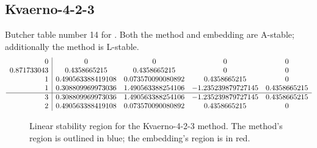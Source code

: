 \documentclass[letterpaper,10pt,english]{sphinxmanual}
\begin{document}
\subsection{Kvaerno-4-2-3}
\label{Butcher:butcher-kvaerno-4-2-3}\label{Butcher:kvaerno-4-2-3}
Butcher table number 14
for {\hyperref[c_interface/User_callable:c.ARKodeSetIRKTableNum]{\emph{}}}.  Both the
method and embedding are A-stable; additionally the method is L-stable.
\begin{gather}
\begin{split}\begin{array}{r|cccc}
  0 & 0 & 0 & 0 & 0 \\
  0.871733043 & 0.4358665215 & 0.4358665215 & 0 & 0 \\
  1 & 0.490563388419108 & 0.073570090080892 & 0.4358665215 & 0 \\
  1 & 0.308809969973036 & 1.490563388254106 & -1.235239879727145 & 0.4358665215 \\
  \hline
  3 & 0.308809969973036 & 1.490563388254106 & -1.235239879727145 & 0.4358665215 \\
  2 & 0.490563388419108 & 0.073570090080892 & 0.4358665215 & 0
\end{array}\end{split}\notag
\end{gather}\begin{figure}[htbp]
\centering
\capstart

\caption{Linear stability region for the Kvaerno-4-2-3 method.  The method's
region is outlined in blue; the embedding's region is in red.}\end{figure}
\end{document}
